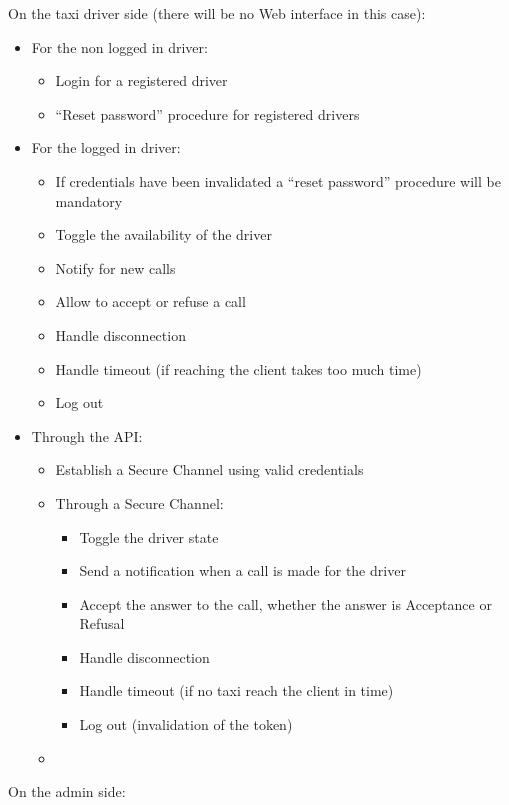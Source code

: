 \documentclass{article}
\begin{document}
On the taxi driver side (there will be no Web interface in this case):\@
\begin{itemize}
	\item For the non logged in driver:
		\begin{itemize}
			\item Login for a registered driver 
			\item ``Reset password'' procedure for registered drivers
		\end{itemize}
	\item For the logged in driver:
		\begin{itemize}
			\item If credentials have been invalidated a ``reset password'' procedure will be mandatory
			\item Toggle the availability of the driver
			\item Notify for new calls
			\item Allow to accept or refuse a call
			\item Handle disconnection 
			\item Handle timeout (if reaching the client takes too much time)
			\item Log out
		\end{itemize}
	\item Through the API:\@
		\begin{itemize}
			\item Establish a Secure Channel using valid credentials 
			\item Through a Secure Channel:\@
				\begin{itemize}
					\item Toggle the driver state
					\item Send a notification when a call is made for the driver
					\item Accept the answer to the call, whether the answer is Acceptance or Refusal
					\item Handle disconnection
					\item Handle timeout (if no taxi reach the client in time)%
					\item Log out (invalidation of the token)
				\end{itemize}
			\item 
		\end{itemize}
\end{itemize}
On the admin side:\@
\end{document}
